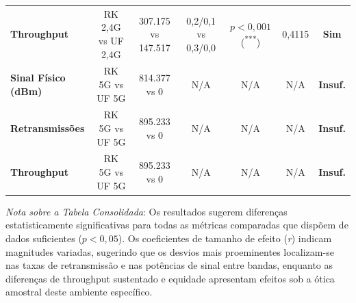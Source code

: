 \begin{table}[H]
{{\begin{tabular}{lcccccc}
      \textbf{Throughput} & RK 2,4G vs UF 2,4G & 307.175 vs 147.517 & 0,2/0,1 vs 0,3/0,0 & $p < 0,001$ (\textsuperscript{***}) & 0,4115 & \textbf{Sim} \\
      \textbf{Sinal Físico (dBm)} & RK 5G vs UF 5G & 814.377 vs 0 & N/A & N/A & N/A & \textbf{Insuf.} \\
      \textbf{Retransmissões} & RK 5G vs UF 5G & 895.233 vs 0 & N/A & N/A & N/A & \textbf{Insuf.} \\
      \textbf{Throughput} & RK 5G vs UF 5G & 895.233 vs 0 & N/A & N/A & N/A & \textbf{Insuf.} \\
      \bottomrule
    \end{tabular}%
  }%
}{%
}
\end{table}

\textit{Nota sobre a Tabela Consolidada}: Os resultados sugerem diferenças estatisticamente significativas para todas as métricas comparadas que dispõem de dados suficientes ($p < 0,05$). Os coeficientes de tamanho de efeito (\textit{r}) indicam magnitudes variadas, sugerindo que os desvios mais proeminentes localizam-se nas taxas de retransmissão e nas potências de sinal entre bandas, enquanto as diferenças de throughput sustentado e equidade apresentam efeitos sob a ótica amostral deste ambiente específico.

